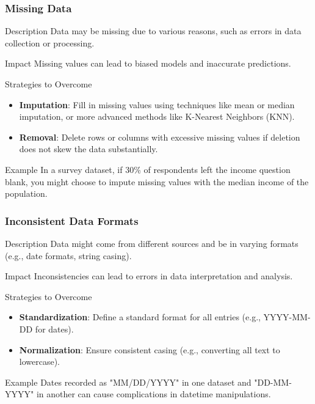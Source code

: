 \documentclass[aspectratio=169]{beamer}
\begin{document}
\begin{frame}[fragile]
    \frametitle{Missing Data}
    \begin{block}{Description}
        Data may be missing due to various reasons, such as errors in data collection or processing.
    \end{block}
    \begin{block}{Impact}
        Missing values can lead to biased models and inaccurate predictions.
    \end{block}
    \begin{block}{Strategies to Overcome}
        \begin{itemize}
            \item \textbf{Imputation}: Fill in missing values using techniques like mean or median imputation, or more advanced methods like K-Nearest Neighbors (KNN).
            \item \textbf{Removal}: Delete rows or columns with excessive missing values if deletion does not skew the data substantially.
        \end{itemize}
    \end{block}
    \begin{block}{Example}
        In a survey dataset, if 30\% of respondents left the income question blank, you might choose to impute missing values with the median income of the population.
    \end{block}
\end{frame}

\begin{frame}[fragile]
    \frametitle{Inconsistent Data Formats}
    \begin{block}{Description}
        Data might come from different sources and be in varying formats (e.g., date formats, string casing).
    \end{block}
    \begin{block}{Impact}
        Inconsistencies can lead to errors in data interpretation and analysis.
    \end{block}
    \begin{block}{Strategies to Overcome}
        \begin{itemize}
            \item \textbf{Standardization}: Define a standard format for all entries (e.g., YYYY-MM-DD for dates).
            \item \textbf{Normalization}: Ensure consistent casing (e.g., converting all text to lowercase).
        \end{itemize}
    \end{block}
    \begin{block}{Example}
        Dates recorded as "MM/DD/YYYY" in one dataset and "DD-MM-YYYY" in another can cause complications in datetime manipulations.
    \end{block}
\end{frame}
\end{document}
